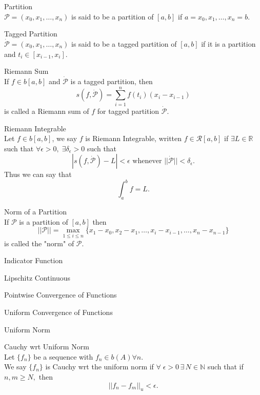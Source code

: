 \documentclass{article}
\newcommand{\natnums}{{\mathbb N}}
\newcommand{\norm}[1]{\left|\left|#1\right|\right|}
\begin{document}
\begin{description}
\item Partition \label{partition}\hfill \\
\(\mathcal{P}=(x_0, x_1, \dots, x_n)\) is said to be a partition of \([a,b]\) if \(a=x_0, x_1, \dots, x_n=b\).

\item Tagged Partition \label{taggedpartition}\hfill \\
\(\dot{\mathcal{P}}=(x_0, x_1, \dots, x_n)\) is said to be a tagged partition of \([a,b]\) if it is a partition and \(t_i\in [x_{i-1}, x_i]\).

\item Riemann Sum \label{riemannsum}\hfill \\
If \(f\in b[a,b]\) and \(\dot{\mathcal{P}}\) is a tagged partition, then \[s(f,\dot{\mathcal{P}}) = \sum_{i=1}^n f(t_i)(x_i-x_{i-1})\] is called a Riemann sum of \(f\) for tagged partition \(\dot{\mathcal{P}}\).

\item Riemann Integrable \label{riemannintegrable}\hfill \\
Let \(f\in b[a,b]\), we say \(f\) is Riemann Integrable, written \(f\in \mathcal{R}[a,b]\) if \(\exists L\in\mathbb{R}\) such that \(\forall \epsilon>0,\;\exists\delta_\epsilon>0\) such that 
\[|s(f, \dot{\mathcal{P}}) - L| < \epsilon \text{ whenever }||\dot{\mathcal{P}}|| < \delta_\epsilon.\]
Thus we can say that 
\[\int_a^b f = L.\]

\item Norm of a Partition \label{partitionnorm}\hfill \\
If \(\mathcal{P}\) is a partition of \([a,b]\) then 
\[||\mathcal{P}|| = \max_{1\leq i\leq n}\{x_1-x_0, x_2-x_1, \dots, x_i- x_{i-1},\dots, x_n-x_{n-1}\}\]
 is called the "norm" of \(\mathcal{P}.\)

\item Indicator Function\label{indicator}\hfill \\

\item Lipschitz Continuous\label{Lipschitz}\hfill \\

\item Pointwise Convergence of Functions\label{pointwiseConv}\hfill \\

\item Uniform Convergence of Functions\label{uniformConv}\hfill \\
    
\item Uniform Norm\label{unorm}\hfill \\

\item Cauchy wrt Uniform Norm\hfill \\
    Let \(\{f_n\}\) be a sequence with \(f_n\in b(A) \forall n\).  \\
    We say \(\{f_n\}\) is Cauchy wrt the uniform norm if \(\forall\;\epsilon >0 \,\exists\,N\in\natnums\) such that 
    if \(n,m\geq N,\) then
    \[\norm{f_n-f_m}_u < \epsilon.\]
\end{description}
\end{document}
